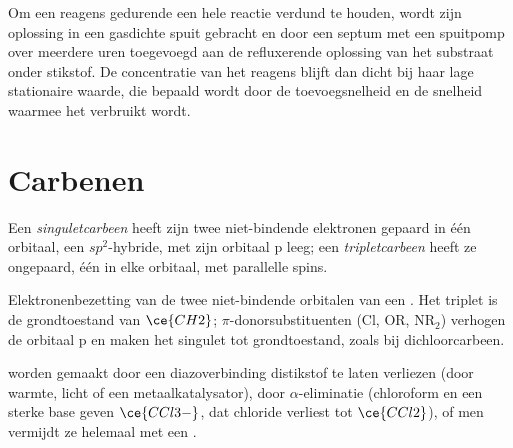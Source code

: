 \begin{inthelab}
Om een reagens gedurende een hele reactie verdund te houden, wordt zijn
oplossing in een gasdichte spuit gebracht en door een septum met een
spuitpomp over meerdere uren toegevoegd aan de refluxerende oplossing van
het substraat onder stikstof. De concentratie van het reagens blijft dan
dicht bij haar lage stationaire waarde, die bepaald wordt door de
toevoegsnelheid en de snelheid waarmee het verbruikt wordt.
\end{inthelab}

\section{Carbenen}

\begin{definition}\label{def:b3:radicals-carbenes:carbene-states}
Een \emph{singuletcarbeen} heeft zijn twee
niet-bindende elektronen gepaard in één orbitaal, een $sp^2$-hybride, met zijn orbitaal p leeg; een
\emph{tripletcarbeen} heeft ze ongepaard, één in
elke orbitaal, met parallelle spins.
\end{definition}

\begin{omfigure}

{\small Elektronenbezetting van de twee niet-bindende orbitalen van een
. Het triplet is de grondtoestand van $\ce{CH2}$; $\pi$-donorsubstituenten (Cl, OR, $\mathrm{NR_2}$) verhogen de
orbitaal p en maken het singulet tot grondtoestand, zoals bij
dichloorcarbeen.}
\end{omfigure}

 worden gemaakt door een diazoverbinding distikstof te laten
verliezen (door warmte, licht of een metaalkatalysator), door
$\alpha$-eliminatie (chloroform en een sterke base geven
$\ce{CCl3-}$, dat chloride verliest tot $\ce{CCl2}$), of men vermijdt ze helemaal met een
.

